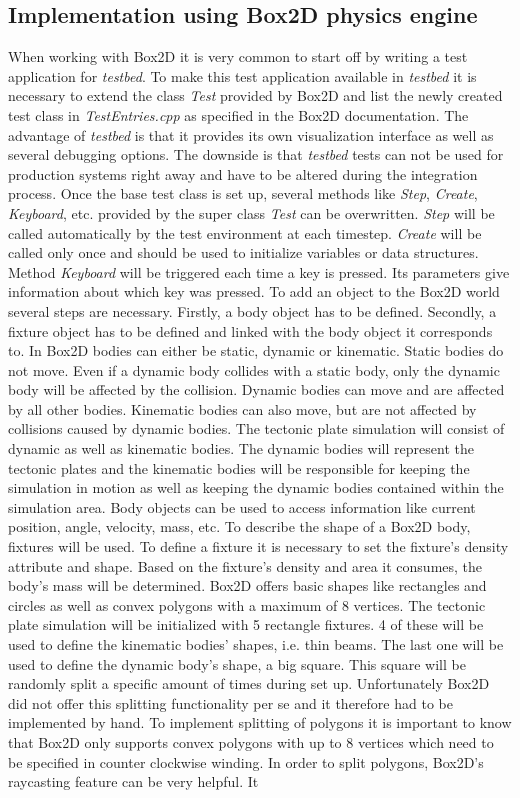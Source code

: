 \documentclass[11pt,a4paper,twoside,openright]{report}
\begin{document}
\subsection{Implementation using Box2D physics engine}
When working with Box2D it is very common to start off by writing a test application for \emph{testbed}. To make this test application available in \emph{testbed} it is necessary to extend the class \emph{Test} provided by Box2D and list the newly created test class in \emph{TestEntries.cpp} as specified in the Box2D documentation. The advantage of \emph{testbed} is that it provides its own visualization interface as well as several debugging options. The downside is that \emph{testbed} tests can not be used for production systems right away and have to be altered during the integration process.
Once the base test class is set up, several methods like \emph{Step}, \emph{Create}, \emph{Keyboard}, etc. provided by the super class \emph{Test} can be overwritten. \emph{Step} will be called automatically by the test environment at each timestep. \emph{Create} will be called only once and should be used to initialize variables or data structures. Method \emph{Keyboard} will be triggered each time a key is pressed. Its parameters give information about which key was pressed. To add an object to the Box2D world several steps are necessary. Firstly, a body object has to be defined. Secondly, a fixture object has to be defined and linked with the body object it corresponds to. In Box2D bodies can either be static, dynamic or kinematic. Static bodies do not move. Even if a dynamic body collides with a static body, only the dynamic body will be affected by the collision. Dynamic bodies can move and are affected by all other bodies. Kinematic bodies can also move, but are not affected by collisions caused by dynamic bodies. The tectonic plate simulation will consist of dynamic as well as kinematic bodies. The dynamic bodies will represent the tectonic plates and the kinematic bodies will be responsible for keeping the simulation in motion as well as keeping the dynamic bodies contained within the simulation area. Body objects can be used to access information like current position, angle, velocity, mass, etc. To describe the shape of a Box2D body, fixtures will be used. To define a fixture it is necessary to set the fixture's density attribute and shape. Based on the fixture's density and area it consumes, the body's mass will be determined. Box2D offers basic shapes like rectangles and circles as well as convex polygons with a maximum of 8 vertices. The tectonic plate simulation will be initialized with 5 rectangle fixtures. 4 of these will be used to define the kinematic bodies' shapes, i.e. thin beams. The last one will be used to define the dynamic body's shape, a big square. This square will be randomly split a specific amount of times during set up. Unfortunately Box2D did not offer this splitting functionality per se and it therefore had to be implemented by hand. To implement splitting of polygons it is important to know that Box2D only supports convex polygons with up to 8 vertices which need to be specified in counter clockwise winding. In order to split polygons, Box2D's raycasting feature can be very helpful. It 
\end{document}
